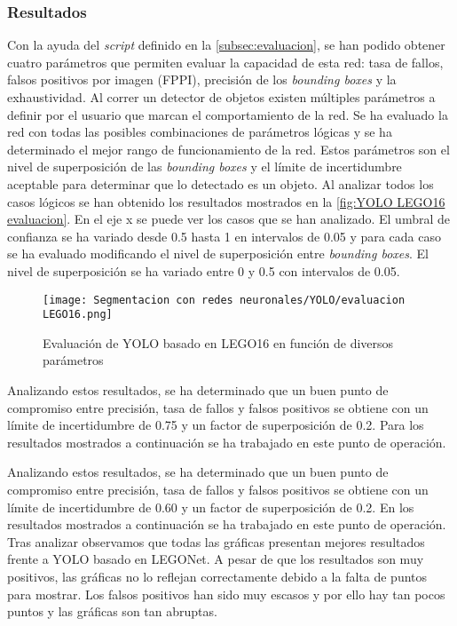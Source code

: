 \subsubsection*{Resultados}
Con la ayuda del \textit{script} definido en la \autoref{subsec:evaluacion}, se han podido obtener cuatro parámetros que permiten evaluar la capacidad de esta red: tasa de fallos, falsos positivos por imagen (FPPI), precisión de los \textit{bounding boxes} y la exhaustividad. Al correr un detector de objetos existen múltiples parámetros a definir por el usuario que marcan el comportamiento de la red. Se ha evaluado la red con todas las posibles combinaciones de parámetros lógicas y se ha determinado el mejor rango de funcionamiento de la red. Estos parámetros son el nivel de superposición de las \textit{bounding boxes} y el límite de incertidumbre aceptable para determinar que lo detectado es un objeto. Al analizar todos los casos lógicos se han obtenido los resultados mostrados en la \autoref{fig:YOLO LEGO16 evaluacion}. En el eje x se puede ver los casos que se han analizado. El umbral de confianza se ha variado desde 0.5 hasta 1 en intervalos de 0.05 y para cada caso se ha evaluado modificando el nivel de superposición entre \textit{bounding boxes}. El nivel de superposición se ha variado entre 0 y 0.5 con intervalos de 0.05.

\begin{figure}[ht]  %
	\centering
	\texttt{[image: Segmentacion con redes neuronales/YOLO/evaluacion LEGO16.png]}
	\caption{Evaluación de YOLO basado en LEGO16 en función de diversos parámetros}
	\label{fig:YOLO LEGO16 evaluacion}
\end{figure}

Analizando estos resultados, se ha determinado que un buen punto de compromiso entre precisión, tasa de fallos y falsos positivos se obtiene con un límite de incertidumbre de 0.75 y un factor de superposición de 0.2.  Para los resultados mostrados a continuación se ha trabajado en este punto de operación.

Analizando estos resultados, se ha determinado que un buen punto de compromiso entre precisión, tasa de fallos y falsos positivos se obtiene con un límite de incertidumbre de 0.60 y un factor de superposición de 0.2. En los resultados mostrados a continuación se ha trabajado en este punto de operación. Tras analizar observamos que todas las gráficas presentan mejores resultados frente a YOLO basado en LEGONet. A pesar de que los resultados son muy positivos, las gráficas no lo reflejan correctamente debido a la falta de puntos para mostrar. Los falsos positivos han sido muy escasos y por ello hay tan pocos puntos y las gráficas son tan abruptas.

